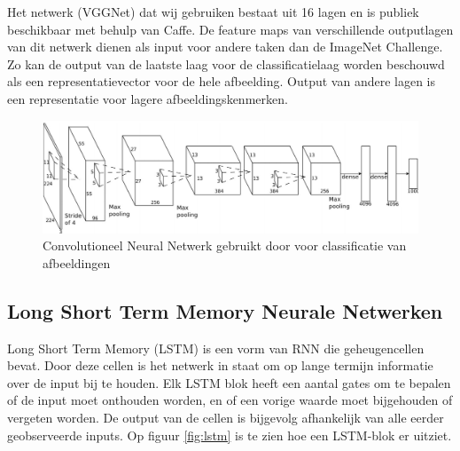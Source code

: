 Het netwerk (VGGNet)\cite{Arge2015} dat wij gebruiken bestaat uit 16 lagen en is publiek beschikbaar met behulp van Caffe\cite{Jia2014}. De feature maps van verschillende outputlagen van dit netwerk dienen als input voor andere taken dan de ImageNet Challenge. Zo kan de output van de laatste laag voor de classificatielaag worden beschouwd als een representatievector voor de hele afbeelding. Output van andere lagen is een representatie voor lagere  afbeeldingskenmerken. 
\begin{figure}[tb]
	\centering
	\includegraphics[width=\linewidth]{Images/cnn.PNG}
    \caption{Convolutioneel Neural Netwerk gebruikt door \cite{Krizhevsky2012a} voor classificatie van afbeeldingen}
	\label{fig:AlexNet}
\end{figure}


\subsection{Long Short Term Memory Neurale Netwerken}
Long Short Term Memory (LSTM) is een vorm van RNN die geheugencellen bevat. Door deze cellen is het netwerk in staat om op lange termijn informatie over de input bij te houden. Elk LSTM blok heeft een aantal gates om te bepalen of de input moet onthouden worden, en of een vorige waarde moet bijgehouden of vergeten worden. De output van de cellen is bijgevolg afhankelijk van alle eerder geobserveerde inputs. Op figuur \ref{fig:lstm} is te zien hoe een LSTM-blok er uitziet.\cite{Google}\cite{SeppHochreiter1997}

